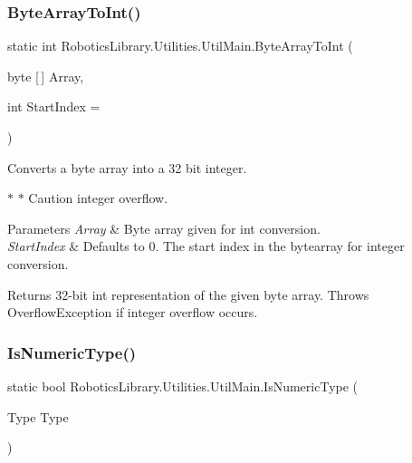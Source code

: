 \subsubsection{\texorpdfstring{Byte\+Array\+To\+Int()}{ByteArrayToInt()}}
{\footnotesize\ttfamily static int Robotics\+Library.\+Utilities.\+Util\+Main.\+Byte\+Array\+To\+Int (\begin{DoxyParamCaption}\item[{byte \mbox{[}$\,$\mbox{]}}]{Array,  }\item[{int}]{Start\+Index = {} }\end{DoxyParamCaption})\hspace{0.3cm}{\ttfamily [static]}}



Converts a byte array into a 32 bit integer. 


\begin{DoxyItemize}
\item $\ast$ $\ast$ Caution integer overflow. 
\end{DoxyItemize}


\begin{DoxyParams}{Parameters}
{\em Array} & Byte array given for int conversion.\\
\hline
{\em Start\+Index} & Defaults to 0. The start index in the bytearray for integer conversion.\\
\hline
\end{DoxyParams}
\begin{DoxyReturn}{Returns}
32-\/bit int representation of the given byte array. Throws {\ttfamily Overflow\+Exception} if integer overflow occurs. 
\end{DoxyReturn}
\mbox{\label{class_robotics_library_1_1_utilities_1_1_util_main_ace1cebf392a2b212cd010f7e718dee7d}} 
\subsubsection{\texorpdfstring{Is\+Numeric\+Type()}{IsNumericType()}}
{\footnotesize\ttfamily static bool Robotics\+Library.\+Utilities.\+Util\+Main.\+Is\+Numeric\+Type (\begin{DoxyParamCaption}\item[{Type}]{Type }\end{DoxyParamCaption})\hspace{0.3cm}{\ttfamily [static]}}



